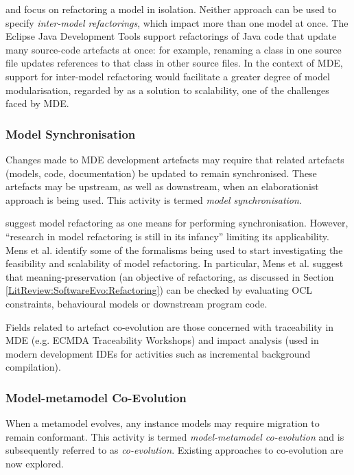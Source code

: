  
\cite{kolovos07ewl} and \cite{arendt09refactoring} focus on refactoring a model in isolation. Neither approach can be used to specify \emph{inter-model refactorings}, which impact more than one model at once. The Eclipse Java Development Tools support refactorings of Java code that update many source-code artefacts at once: for example, renaming a class in one source file updates references to that class in other source files. In the context of MDE, support for inter-model refactoring would facilitate a greater degree of model modularisation, regarded by \cite{kolovos08scalability} as a solution to scalability, one of the challenges faced by MDE.
 



\subsubsection{Model Synchronisation}
\label{LitReview:ArtefactCoEvo}
Changes made to MDE development artefacts may require that related artefacts (models, code, documentation) be updated to remain synchronised. These artefacts may be upstream, as well as downstream, when an elaborationist approach is being used. This activity is termed \textit{model synchronisation}.

\cite{mens07modelrefactoring} suggest model refactoring as one means for performing synchronisation. However, ``research in model refactoring is still in its infancy'' \cite{mens07modelrefactoring} limiting its applicability. Mens et al. identify some of the formalisms being used to start investigating the feasibility and scalability of model refactoring. In particular, Mens et al. suggest that meaning-preservation (an objective of refactoring, as discussed in Section \ref{LitReview:SoftwareEvo:Refactoring}) can be checked by evaluating OCL constraints, behavioural models or downstream program code.

Fields related to artefact co-evolution are those concerned with traceability in MDE (e.g. ECMDA Traceability Workshops) and impact analysis (used in modern development IDEs for activities such as incremental background compilation).

\subsubsection{Model-metamodel Co-Evolution}
\label{LitReview:ModelCoEvo}
When a metamodel evolves, any instance models may require migration to remain conformant. This activity is termed \textit{model-metamodel co-evolution} and is subsequently referred to as \emph{co-evolution}. Existing approaches to co-evolution are now explored.

